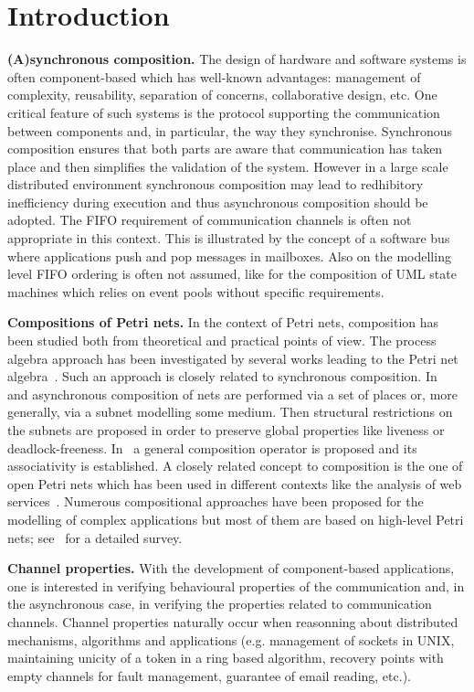 \section{Introduction}
\label{sec:introduction}


{\bf (A)synchronous composition.} 
The design of hardware and software systems
is often component-based which has well-known advantages: management
of complexity, reusability, separation of concerns, collaborative design, etc.
One critical feature of such systems is the protocol
supporting the communication between components and, in particular,
the way they synchronise. Synchronous composition ensures
that both parts are aware that communication has taken place
and then simplifies the validation of the system.
However in a large scale distributed environment synchronous
composition may lead to redhibitory inefficiency during execution
and thus asynchronous composition should be adopted.
The FIFO requirement of communication channels is often not appropriate
in this context.
This is illustrated 
by the concept of a software bus where applications push and pop messages
in mailboxes. Also on the modelling level FIFO ordering is often not assumed,
like for the composition of UML state machines which relies on event pools without specific
requirements.


\noindent
{\bf Compositions of Petri nets.}
In the context of Petri nets, composition has been studied both from
theoretical and practical points of view. The process algebra approach
has been investigated by several works leading to the Petri net 
algebra~\cite{BDK01}. Such an approach is closely related to synchronous composition.
In~\cite{Souissi90} and \cite{SM89} asynchronous composition of nets are performed
via a set of places or, more generally, via a subnet modelling some medium. Then
structural restrictions on the subnets are proposed in order to preserve
global properties like liveness or deadlock-freeness.
In~\cite{reisig09} a general composition operator is proposed and
its associativity is established. A closely related concept to composition
is the one of open Petri nets which has been used in different contexts
like the analysis of web services~\cite{DK2009}.
Numerous compositional approaches have been proposed for the modelling of complex applications
but most of them are based on high-level Petri nets; see~\cite{GB05} for a detailed
survey.


\noindent
{\bf Channel properties.} With the development of component-based
applications, one is interested in verifying behavioural properties
of the communication and, in the asynchronous
case, in verifying the properties related to communication channels.
Channel properties naturally occur when reasonning about distributed
mechanisms, algorithms and applications (e.g. management of sockets in UNIX,
maintaining unicity of a token in a ring based algorithm, recovery points
with empty channels for fault management, guarantee of email reading, etc.).



